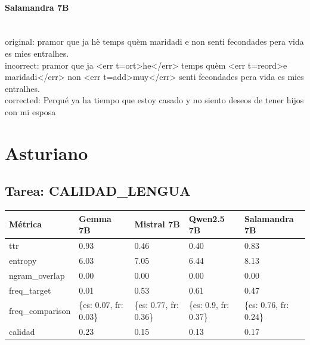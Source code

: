 \paragraph{Salamandra 7B}~\\
{original:} pr\textquotesingle{}amor que ja hè temps qu\textquotesingle{}èm maridadi e non senti fecondades pera vida es mies entralhes.\\
{incorrect:} pr\textquotesingle{}amor que ja {\textless}err t=ort{\textgreater}he{\textless}/err{\textgreater} temps qu\textquotesingle{}èm {\textless}err t=reord{\textgreater}e maridadi{\textless}/err{\textgreater} non {\textless}err t=add{\textgreater}muy{\textless}/err{\textgreater} senti fecondades pera vida es mies entralhes.\\
{corrected:} Perqué ya ha tiempo que estoy casado y no siento deseos de tener hijos con mi esposa\\

\section{Asturiano}

\subsection{Tarea: CALIDAD\_LENGUA}\label{tarea-calidad_lengua}
{\def\LTcaptype{none}
\begin{longtable}[]{@{}lllll@{}}
\toprule\noalign{}
Métrica & Gemma 7B & Mistral 7B & Qwen2.5 7B & Salamandra 7B \\
\midrule\noalign{}
\endhead
\bottomrule\noalign{}
\endlastfoot
ttr & 0.93 & 0.46 & 0.40 & 0.83 \\
entropy & 6.03 & 7.05 & 6.44 & 8.13 \\
ngram\_overlap & 0.00 & 0.00 & 0.00 & 0.00 \\
freq\_target & 0.01 & 0.53 & 0.61 & 0.47 \\
freq\_comparison & \{\textquotesingle{}es\textquotesingle{}: 0.07, \textquotesingle{}fr\textquotesingle{}: 0.03\} & \{\textquotesingle{}es\textquotesingle{}: 0.77, \textquotesingle{}fr\textquotesingle{}: 0.36\} & \{\textquotesingle{}es\textquotesingle{}: 0.9, \textquotesingle{}fr\textquotesingle{}: 0.37\} & \{\textquotesingle{}es\textquotesingle{}: 0.76, \textquotesingle{}fr\textquotesingle{}: 0.24\} \\
calidad & 0.23 & 0.15 & 0.13 & 0.17 \\
\end{longtable}}


